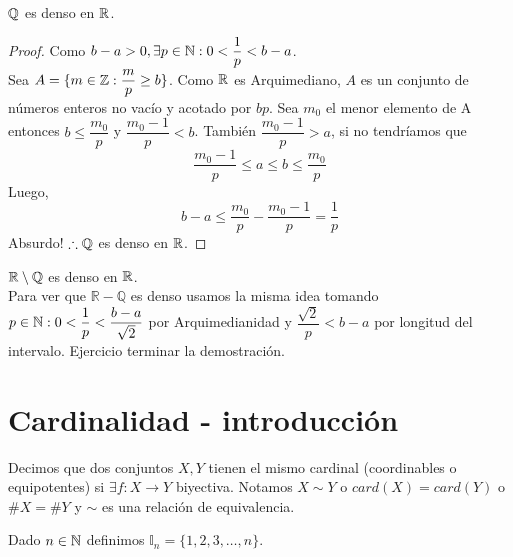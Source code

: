 \begin{eg}
    \(\mathbb{Q} \) es denso en \(\mathbb{R} \).
    \begin{proof}
        Como \(b-a>0, \exists p\in \mathbb{N}: 0 < \dfrac{1}{p}<b-a\). \\
        Sea \(A = \{ m \in \mathbb{Z}: \dfrac{m}{p} \geq b \} \). Como \(\mathbb{R} \) es Arquimediano, \(A\) es un conjunto de números enteros no vacío y acotado por \(bp\). Sea \(m_0\) el menor elemento de A entonces \(b\leq \dfrac{m_0}{p} \) y \(\dfrac{m_0-1}{p} <b\). También \(\dfrac{m_0-1}{p} > a\), si no tendríamos que
        \begin{equation*}
            \dfrac{m_0-1}{p} \leq a \leq b \leq \dfrac{m_0}{p}
        \end{equation*}
        Luego,
        \begin{equation*}
            b-a \leq \dfrac{m_0}{p} - \dfrac{m_0-1}{p} = \dfrac1p
        \end{equation*}
        Absurdo! \(\therefore \mathbb{Q} \) es denso en \(\mathbb{R} \).
    \end{proof}
\end{eg}

\begin{eg}
    \(\mathbb{R} \setminus \mathbb{Q} \) es denso en \(\mathbb{R} \). \\
    Para ver que \(\mathbb{R-Q} \) es denso usamos la misma idea tomando \(p \in \mathbb{N} :0<\dfrac1p<\dfrac{b-a}{\sqrt2} \) por Arquimedianidad y \(\dfrac{\sqrt2}{p} < b-a\) por longitud del intervalo.
    Ejercicio terminar la demostración.
\end{eg}

\section{Cardinalidad - introducción}

\begin{definition}
    Decimos que dos conjuntos \(X, Y\) tienen el mismo cardinal (coordinables o equipotentes) si \(\exists f: X \to Y\) biyectiva. Notamos \(X \sim Y\) o \(card(X) = card(Y)\) o \( \#X=\#Y\) y \(\sim \) es una relación de equivalencia.
\end{definition}

Dado \(n \in \mathbb{N} \) definimos \(\mathbb{I}_n = \{1, 2, 3,\ldots, n\} \).

